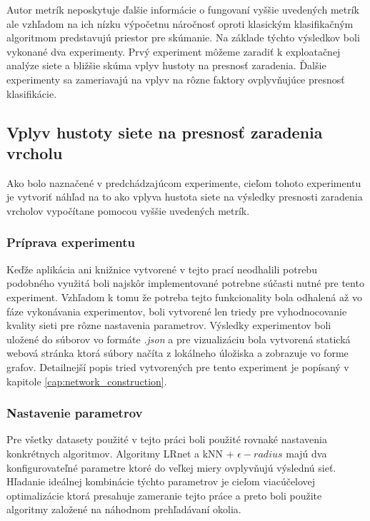 \documentclass[slovak,master,dept460,male,cpp,cpdeclaration]{diploma}
\begin{document}
Autor metrík neposkytuje ďalšie informácie o fungovaní vyššie uvedených metrík ale vzhľadom na ich nízku výpočetnu náročnosť oproti klasickým klasifikačným algoritmom predstavujú priestor pre skúmanie. Na základe týchto výsledkov boli vykonané dva experimenty. Prvý experiment môžeme zaradiť k exploatačnej analýze siete a bližšie skúma vplyv hustoty na presnosť zaradenia.  Ďalšie experimenty sa zameriavajú na vplyv na rôzne faktory ovplyvňujúce presnosť klasifikácie.

\subsection{Vplyv hustoty siete na presnosť zaradenia vrcholu}
\label{exp:density_impact}
Ako bolo naznačené v predchádzajúcom experimente, cieľom tohoto experimentu je vytvoriť náhľad na to ako vplyva hustota siete na výsledky presnosti zaradenia vrcholov vypočítane pomocou vyššie uvedených metrík. 

\subsubsection{Príprava experimentu}
Keďže aplikácia ani knižnice vytvorené v tejto prací neodhalili potrebu podobného využitá boli najskôr implementované potrebne súčasti nutné pre tento experiment.  Vzhľadom k tomu že potreba tejto funkcionality bola odhalená až vo fáze vykonávania experimentov, boli vytvorené len triedy pre vyhodnocovanie kvality sieti pre rôzne nastavenia parametrov. Výsledky experimentov boli uložené do súborov vo formáte \textit{.json} a pre vizualizáciu bola vytvorená statická webová stránka ktorá súbory načíta z lokálneho úložiska a zobrazuje vo forme grafov. Detailnejší popis tried vytvorených pre tento experiment je popísaný v kapitole \ref{cap:network_construction}.

\subsubsection{Nastavenie parametrov}
Pre všetky datasety použité v tejto práci boli použité rovnaké nastavenia konkrétnych algoritmov. Algoritmy LRnet a kNN + $\epsilon-radius$ majú dva konfigurovateľné parametre ktoré do veľkej miery ovplyvňujú výslednú sieť. Hľadanie ideálnej kombinácie týchto parametrov je cieľom viacúčelovej optimalizácie ktorá presahuje zameranie tejto práce a preto boli použite algoritmy založené na náhodnom prehľadávaní okolia.
\end{document}
